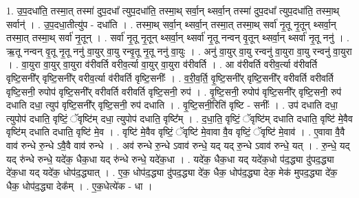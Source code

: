 \documentclass[17pt]{extarticle}
\begin{document}
1. उ॒प॒दधा॑ति॒ तस्मा॒त् तस्मा॑ दुप॒दधा᳚ त्युप॒दधा॑ति॒ तस्मा॒थ् सर्वा॒न् थ्सर्वा॒न् तस्मा॑ दुप॒दधा᳚ त्युप॒दधा॑ति॒ तस्मा॒थ् सर्वान्॑ । . उ॒प॒दधा॒तीत्यु॑प - दधा॑ति । . तस्मा॒थ् सर्वा॒न् थ्सर्वा॒न् तस्मा॒त् तस्मा॒थ् सर्वा॑ नृ॒तू नृ॒तून् थ्सर्वा॒न् तस्मा॒त् तस्मा॒थ् सर्वा॑ नृ॒तून् । . सर्वा॑ नृ॒तू नृ॒तून् थ्सर्वा॒न् थ्सर्वा॑ नृ॒तू नन्वन् वृ॒तून् थ्सर्वा॒न् थ्सर्वा॑ नृ॒तू ननु॑ । . ऋ॒तू नन्वन् वृ॒तू नृ॒तू ननु॑ वा॒युर् वा॒यु रन्वृ॒तू नृ॒तू ननु॑ वा॒युः । . अनु॑ वा॒युर् वा॒यु रन्वनु॑ वा॒युरा वा॒यु रन्वनु॑ वा॒युरा । . वा॒युरा वा॒युर् वा॒युरा व॑रीवर्ति वरीव॒र्त्या वा॒युर् वा॒युरा व॑रीवर्ति । . आ व॑रीवर्ति वरीव॒र्त्या व॑रीवर्ति वृष्टि॒सनी᳚र् वृष्टि॒सनी᳚र् वरीव॒र्त्या व॑रीवर्ति वृष्टि॒सनीः᳚ । . व॒री॒व॒र्ति॒ वृ॒ष्टि॒सनी᳚र् वृष्टि॒सनी᳚र् वरीवर्ति वरीवर्ति वृष्टि॒सनी॒ रुपोप॑ वृष्टि॒सनी᳚र् वरीवर्ति वरीवर्ति वृष्टि॒सनी॒ रुप॑ । . वृ॒ष्टि॒सनी॒ रुपोप॑ वृष्टि॒सनी᳚र् वृष्टि॒सनी॒ रुप॑ दधाति दधा॒ त्युप॑ वृष्टि॒सनी᳚र् वृष्टि॒सनी॒ रुप॑ दधाति । . वृ॒ष्टि॒सनी॒रिति॑ वृष्टि - सनीः᳚ । . उप॑ दधाति दधा॒ त्युपोप॑ दधाति॒ वृष्टिं॒ ॅवृष्टि॑म् दधा॒ त्युपोप॑ दधाति॒ वृष्टि᳚म् । . द॒धा॒ति॒ वृष्टिं॒ ॅवृष्टि॑म् दधाति दधाति॒ वृष्टि॑ मे॒वैव वृष्टि॑म् दधाति दधाति॒ वृष्टि॑ मे॒व । . वृष्टि॑ मे॒वैव वृष्टिं॒ ॅवृष्टि॑ मे॒वावा वै॒व वृष्टिं॒ ॅवृष्टि॑ मे॒वाव॑ । . ए॒वावा वै॒वै वाव॑ रुन्धे रु॒न्धे ऽवै॒वै वाव॑ रुन्धे । . अव॑ रुन्धे रु॒न्धे ऽवाव॑ रुन्धे॒ यद् यद् रु॒न्धे ऽवाव॑ रुन्धे॒ यत् । . रु॒न्धे॒ यद् यद् रु॑न्धे रुन्धे॒ यदे॑क॒ धैक॒धा यद् रु॑न्धे रुन्धे॒ यदे॑क॒धा । . यदे॑क॒ धैक॒धा यद् यदे॑क॒धो प॑द॒द्ध्या दु॑पद॒द्ध्या दे॑क॒धा यद् यदे॑क॒ धोप॑द॒द्ध्यात् । . ए॒क॒ धोप॑द॒द्ध्या दु॑पद॒द्ध्या दे॑क॒ धैक॒ धोप॑द॒द्ध्या देक॒ मेक॑ मुपद॒द्ध्या दे॑क॒
धैक॒ धोप॑द॒द्ध्या देक᳚म् । . ए॒क॒धेत्ये॑क - धा । \newline
\end{document}

